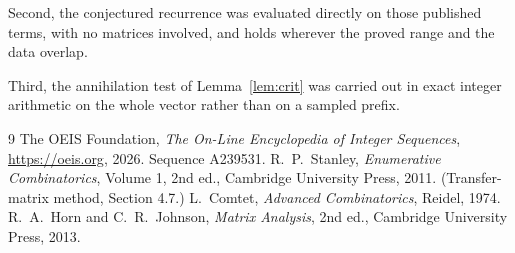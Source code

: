 \documentclass[11pt,a4paper]{article}
\theoremstyle{plain}
\theoremstyle{definition}
\begin{document}
Second, the conjectured recurrence was evaluated directly on those published terms, with no
matrices involved, and holds wherever the proved range and the data overlap.

Third, the annihilation test of Lemma~\ref{lem:crit} was carried out in exact integer
arithmetic on the whole vector rather than on a sampled prefix.

\begin{thebibliography}{9}
 The OEIS Foundation, \emph{The On-Line Encyclopedia of Integer
Sequences}, \url{https://oeis.org}, 2026. Sequence A239531.
 R.~P.~Stanley, \emph{Enumerative Combinatorics}, Volume 1, 2nd ed.,
Cambridge University Press, 2011. (Transfer-matrix method, Section 4.7.)
 L.~Comtet, \emph{Advanced Combinatorics}, Reidel, 1974.
 R.~A.~Horn and C.~R.~Johnson, \emph{Matrix Analysis}, 2nd ed., Cambridge
University Press, 2013.
\end{thebibliography}
\end{document}
